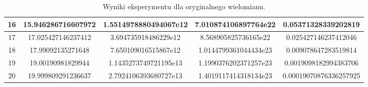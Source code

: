 \documentclass{article}
\begin{document}
\begin{table}[H]
\begin{adjustbox}{center}
\begin{tabular}{|c|c|c|c|c|}
    \hline
    16 & 15.946286716607972 & 1.5514978880494067e12 & 7.010874106897764e22 & 0.05371328339202819\\
    \hline
    17 & 17.025427146237412 & 3.694735918486229e12 & 8.568905825736165e22 & 0.025427146237412046\\
    \hline
    18 & 17.99092135271648 & 7.650109016515867e12 & 1.0144799361044434e23 & 0.009078647283519814\\
    \hline
    19 & 19.00190981829944 & 1.1435273749721195e13 & 1.1990376202371257e23 & 0.0019098182994383706\\
    \hline
    20 & 19.999809291236637 & 2.7924106393680727e13 & 1.4019117414318134e23 & 0.00019070876336257925\\
    \hline
\end{tabular}
\end{adjustbox}
\caption{Wyniki eksperymentu dla oryginalnego wielomianu.}
\end{table}
\end{document}
